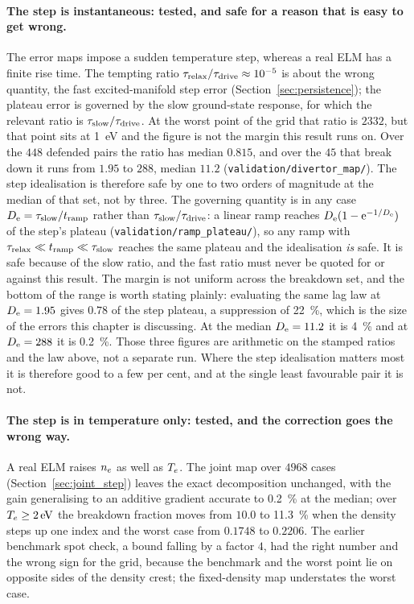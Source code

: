 \paragraph{The step is instantaneous: tested, and safe for a reason that is
easy to get wrong.} The error maps impose a sudden temperature step, whereas a
real ELM has a finite rise time. The tempting ratio
$\tau_{\mathrm{relax}}/\tau_{\mathrm{drive}} \approx 10^{-5}$ is about the wrong quantity, the fast
excited-manifold step error (Section~\ref{sec:persistence}); the plateau error
is governed by the slow ground-state response, for which the relevant ratio is
$\tau_{\mathrm{slow}}/\tau_{\mathrm{drive}}$. At the worst point of the grid that
ratio is $2332$, but that point sits at \SI{1}{\electronvolt} and the figure is
not the margin this result runs on. Over the $448$ defended pairs the ratio has
median $0.815$, and over the $45$ that break down it runs from $1.95$ to $288$,
median $11.2$ (\texttt{validation/divertor\_map/}). The step idealisation is
therefore safe by one to two orders of magnitude at the median of that set, not
by three. The governing quantity is in any case
$D_{\rm e} = \tau_{\mathrm{slow}}/t_{\rm ramp}$ rather than $\tau_{\mathrm{slow}}/\tau_{\mathrm{drive}}$: a linear
ramp reaches $D_{\rm e}(1-\mathrm{e}^{-1/D_{\rm e}})$ of the step's plateau
(\texttt{validation/ramp\_plateau/}), so any ramp with
$\tau_{\mathrm{relax}} \ll t_{\rm ramp} \ll \tau_{\mathrm{slow}}$ reaches the same plateau and the
idealisation \emph{is} safe. It is safe because of the slow ratio, and the fast
ratio must never be quoted for or against this result. The margin is not
uniform across the breakdown set, and the bottom of the range is worth stating
plainly: evaluating the same lag law at $D_{\rm e} = 1.95$ gives $0.78$ of the
step plateau, a suppression of \SI{22}{\percent}, which is the size of the
errors this chapter is discussing. At the median $D_{\rm e} = 11.2$ it is
\SI{4}{\percent} and at $D_{\rm e} = 288$ it is \SI{0.2}{\percent}. Those three
figures are arithmetic on the stamped ratios and the law above, not a separate
run. Where the step idealisation matters most it is therefore good to a few per
cent, and at the single least favourable pair it is not.

\paragraph{The step is in temperature only: tested, and the correction goes the
wrong way.} A real ELM raises $n_e$ as well as $T_e$. The joint map over $4968$
cases (Section~\ref{sec:joint_step}) leaves the exact decomposition unchanged,
with the gain generalising to an additive gradient accurate to
\SI{0.2}{\percent} at the median; over $T_e\ge\SI{2}{\electronvolt}$ the
breakdown fraction moves from $10.0$ to \SI{11.3}{\percent} when the density
steps up one index and the worst case from $0.1748$ to $0.2206$. The earlier
benchmark spot check, a bound falling by a factor $4$, had the right number and
the wrong sign for the grid, because the benchmark and the worst point lie on
opposite sides of the density crest; the fixed-density map understates the
worst case.

